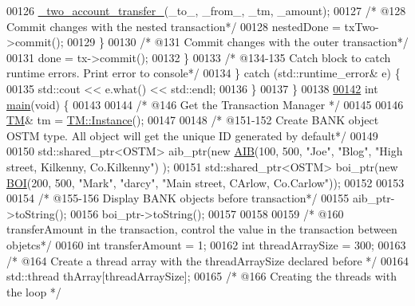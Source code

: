 \begin{DoxyCode}
00126                 \hyperlink{main_8cpp_a83aef8c5b69afef4e38d14c17fe782b3_a83aef8c5b69afef4e38d14c17fe782b3}{\_two\_account\_transfer\_}(\_to\_, \_from\_, \_tm, \_amount);
00127                 \textcolor{comment}{/* @128 Commit changes with the nested transaction*/}
00128                 nestedDone = txTwo->commit();
00129             \}
00130             \textcolor{comment}{/* @131 Commit changes with the outer transaction*/}
00131             done = tx->commit();
00132         \}
00133     \textcolor{comment}{/* @134-135 Catch block to catch runtime errors. Print error to console*/}
00134     \} \textcolor{keywordflow}{catch} (std::runtime\_error& e) \{
00135         std::cout << e.what() << std::endl;
00136     \}
00137 \}
00138 
\hypertarget{main_8cpp_source.tex_l00142}{}\hyperlink{main_8cpp_a840291bc02cba5474a4cb46a9b9566fe_a840291bc02cba5474a4cb46a9b9566fe}{00142} \textcolor{keywordtype}{int} \hyperlink{main_8cpp_a840291bc02cba5474a4cb46a9b9566fe_a840291bc02cba5474a4cb46a9b9566fe}{main}(\textcolor{keywordtype}{void}) \{
00143     
00144      \textcolor{comment}{/* @146 Get the Transaction Manager */}
00145      
00146     \hyperlink{class_t_m}{TM}& tm = \hyperlink{class_t_m_a7ce5f35e0dae76df4fe116cf905bbe60_a7ce5f35e0dae76df4fe116cf905bbe60}{TM::Instance}();
00147     
00148      \textcolor{comment}{/* @151-152 Create BANK object OSTM type. All object will get the unique ID generated by default*/}
00149      
00150     std::shared\_ptr<OSTM> aib\_ptr(\textcolor{keyword}{new} \hyperlink{class_a_i_b}{AIB}(100, 500, \textcolor{stringliteral}{"Joe"}, \textcolor{stringliteral}{"Blog"}, \textcolor{stringliteral}{"High street, Kilkenny, Co.Kilkenny"})
      );
00151     std::shared\_ptr<OSTM> boi\_ptr(\textcolor{keyword}{new} \hyperlink{class_b_o_i}{BOI}(200, 500, \textcolor{stringliteral}{"Mark"}, \textcolor{stringliteral}{"darcy"}, \textcolor{stringliteral}{"Main street, CArlow, Co.Carlow"}));
00152 
00153      
00154      \textcolor{comment}{/* @155-156 Display BANK objects before transaction*/}
00155     aib\_ptr->toString();
00156     boi\_ptr->toString();
00157     
00158      
00159      \textcolor{comment}{/* @160 transferAmount in the transaction, control the value in the transaction between objetcs*/}
00160     \textcolor{keywordtype}{int} transferAmount = 1;
00162     \textcolor{keywordtype}{int} threadArraySize = 300;
00163     \textcolor{comment}{/* @164 Create a thread array with the threadArraySize declared before  */}
00164     std::thread thArray[threadArraySize];
00165     \textcolor{comment}{/* @166 Creating the threads with the loop */}

\end{DoxyCode}
